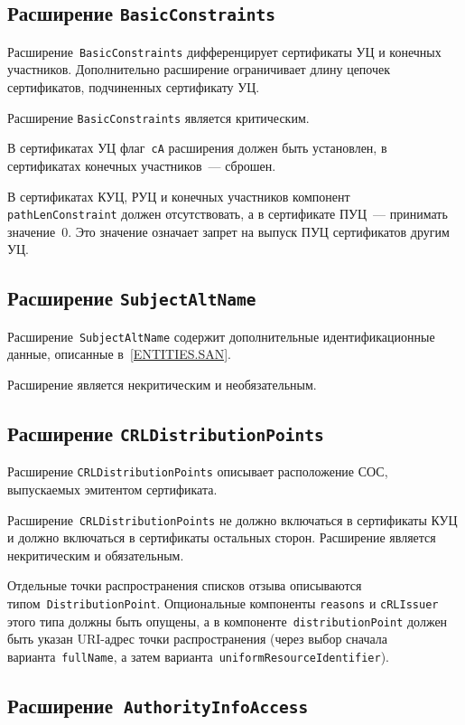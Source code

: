 \subsection{Расширение \texttt{BasicConstraints}}

Расширение~\texttt{BasicConstraints} дифференцирует сертификаты УЦ и
конечных участников. Дополнительно расширение ограничивает 
длину цепочек сертификатов, подчиненных сертификату УЦ.

Расширение \texttt{BasicConstraints} является критическим.

В сертификатах УЦ флаг~\texttt{сA} расширения должен быть 
установлен, в сертификатах конечных участников~--- сброшен. 

В сертификатах КУЦ, РУЦ и конечных участников компонент 
\texttt{pathLenConstraint} должен отсутствовать,
а в сертификате ПУЦ~--- принимать значение~0. 
Это значение означает запрет на выпуск ПУЦ сертификатов 
другим УЦ. 

\subsection{Расширение \texttt{SubjectAltName}}

Расширение~\texttt{SubjectAltName} содержит дополнительные 
идентификационные данные, описанные в~\ref{ENTITIES.SAN}. 

Расширение является некритическим и необязательным.

\subsection{Расширение \texttt{CRLDistributionPoints}}

Расширение \texttt{CRLDistributionPoints} описывает расположение СОС, 
выпускаемых эмитентом сертификата. 

Расширение~\texttt{CRLDistributionPoints} 
не должно включаться в сертификаты КУЦ и должно включаться в
сертификаты остальных сторон. Расширение является некритическим и обязательным.

Отдельные точки распространения списков отзыва описываются 
типом~\texttt{DistributionPoint}. Опциональные компоненты \texttt{reasons} 
и \texttt{cRLIssuer} этого типа должны быть опущены, а в 
компоненте~\texttt{distributionPoint} должен быть указан 
URI-адрес точки распространения (через выбор сначала 
варианта~\texttt{fullName}, а затем 
варианта~\texttt{uniformResourceIdentifier}). 

\subsection{Расширение~\texttt{AuthorityInfoAccess}}

